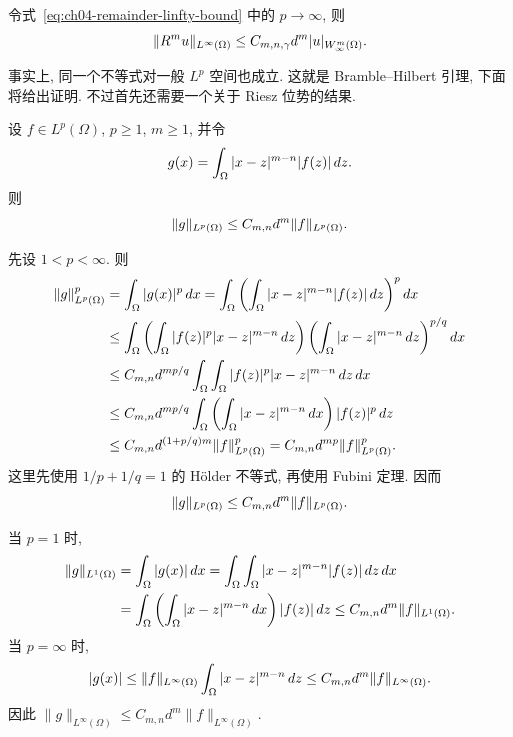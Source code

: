 令式~\eqref{eq:ch04-remainder-linfty-bound} 中的 $p\to\infty$, 则
\begin{equation}
\MathBookFormulaID{formula-ch04-remainder-linfty-p-infinity}
\label{eq:ch04-remainder-linfty-p-infinity}
\|R^m u\|_{L^\infty(\Omega)}
\leq C_{m,n,\gamma}d^m|u|_{W_\infty^m(\Omega)}.
\end{equation}

事实上, 同一个不等式对一般 $L^p$ 空间也成立. 这就是 Bramble--Hilbert 引理, 下面将给出证明. 不过首先还需要一个关于 Riesz 位势的结果.

\setcounter{thmcount}{5}
\begin{Lemma}
\label{lem:ch04-riesz-potential-lp-bound}
设 $f\in L^p(\Omega)$, $p\geq1$, $m\geq1$, 并令
\[
\MathBookFormulaID{formula-ch04-riesz-potential-g-definition}
g(x)=\int_\Omega|x-z|^{m-n}|f(z)|\,dz.
\]
则
\begin{equation}
\MathBookFormulaID{formula-ch04-riesz-potential-lp-bound}
\label{eq:ch04-riesz-potential-lp-bound}
\|g\|_{L^p(\Omega)}\leq C_{m,n}d^m\|f\|_{L^p(\Omega)}.
\end{equation}
\end{Lemma}
\begin{Proof}
先设 $1<p<\infty$. 则
\[
\MathBookFormulaID{formula-ch04-riesz-potential-lp-holder-proof}
\begin{aligned}
\|g\|_{L^p(\Omega)}^p
&=\int_\Omega|g(x)|^p\,dx
=\int_\Omega\left(\int_\Omega|x-z|^{m-n}|f(z)|\,dz\right)^pdx\\
&\leq\int_\Omega\left(\int_\Omega|f(z)|^p|x-z|^{m-n}\,dz\right)
\left(\int_\Omega|x-z|^{m-n}\,dz\right)^{p/q}dx\\
&\leq C_{m,n}d^{mp/q}\int_\Omega\int_\Omega
|f(z)|^p|x-z|^{m-n}\,dz\,dx\\
&\leq C_{m,n}d^{mp/q}\int_\Omega
\left(\int_\Omega|x-z|^{m-n}\,dx\right)|f(z)|^p\,dz\\
&\leq C_{m,n}d^{(1+p/q)m}\|f\|_{L^p(\Omega)}^p
=C_{m,n}d^{mp}\|f\|_{L^p(\Omega)}^p.
\end{aligned}
\]
这里先使用 $1/p+1/q=1$ 的 Hölder 不等式, 再使用 Fubini 定理. 因而
\[
\MathBookFormulaID{formula-ch04-riesz-potential-lp-conclusion}
\|g\|_{L^p(\Omega)}\leq C_{m,n}d^m\|f\|_{L^p(\Omega)}.
\]

当 $p=1$ 时,
\[
\MathBookFormulaID{formula-ch04-riesz-potential-l1-proof}
\begin{aligned}
\|g\|_{L^1(\Omega)}
&=\int_\Omega|g(x)|\,dx
=\int_\Omega\int_\Omega|x-z|^{m-n}|f(z)|\,dz\,dx\\
&=\int_\Omega\left(\int_\Omega|x-z|^{m-n}\,dx\right)|f(z)|\,dz
\leq C_{m,n}d^m\|f\|_{L^1(\Omega)}.
\end{aligned}
\]
当 $p=\infty$ 时,
\[
\MathBookFormulaID{formula-ch04-riesz-potential-linfty-proof}
|g(x)|\leq\|f\|_{L^\infty(\Omega)}\int_\Omega|x-z|^{m-n}\,dz
\leq C_{m,n}d^m\|f\|_{L^\infty(\Omega)}.
\]
因此 $\|g\|_{L^\infty(\Omega)}\leq C_{m,n}d^m\|f\|_{L^\infty(\Omega)}$.
\end{Proof}

